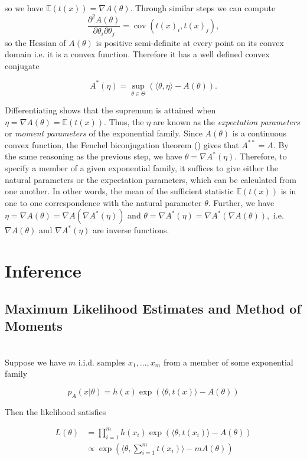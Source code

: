 \documentclass[BSc]{usydthesis}
\numberwithin{equation}{chapter}
\theoremstyle{remark}
\begin{document}
so we have $\mathbb{E}(t(x)) = \nabla A(\theta).$ Through similar steps we can compute $$\frac{\partial^2 A(\theta)}{\partial \theta_i \partial \theta_j} = \operatorname{cov}(t(x)_i, t(x)_j),$$ so the Hessian of $A(\theta)$ is positive semi-definite at every point on its convex domain i.e. it is a convex function. Therefore it has a well defined convex conjugate

$$A^*(\eta) = \sup_{\theta \in \Theta} \left( \langle \theta, \eta \rangle - A(\theta) \right).$$

Differentiating shows that the supremum is attained when $\eta = \nabla A(\theta) = \mathbb{E}(t(x)).$ Thus, the $\eta$ are known as the {\em expectation parameters} or {\em moment parameters} of the exponential family. Since $A(\theta)$ is a continuous convex function, the Fenchel biconjugation theorem (\cite{Bi}) gives that $A^{**} = A.$ By the same reasoning as the previous step, we have $\theta = \nabla A^*(\eta).$ Therefore, to specify a member of a given exponential family, it suffices to give either the natural parameters or the expectation parameters, which can be calculated from one another. In other words, the mean of the sufficient statistic $\mathbb{E}(t(x))$ is in one to one correspondence with the natural parameter $\theta.$ Further, we have $\eta = \nabla A(\theta) = \nabla A(\nabla A^*(\eta))$ and $\theta = \nabla A^*(\eta) = \nabla A^*(\nabla A(\theta)),$ i.e. $\nabla A(\theta)$ and $\nabla A^*(\eta)$ are inverse functions.


\section{Inference}

\subsection{Maximum Likelihood Estimates and Method of Moments} \ \\
Suppose we have $m$ i.i.d. samples $x_1,\ldots, x_m$ from a member of some exponential family

$$ p_A(x|\theta) = h(x) \exp( \langle \theta, t(x) \rangle - A(\theta))$$

Then the likelihood satisfies 

\begin{align*}
 L(\theta) &= \prod_{i=1}^m h(x_i) \exp( \langle \theta, t(x_i) \rangle - A(\theta))\\
           &\propto \exp \left( \bigg\langle \theta, \sum_{i=1}^m t(x_i)\bigg\rangle - m A(\theta) \right)
\end{align*}
\end{document}
